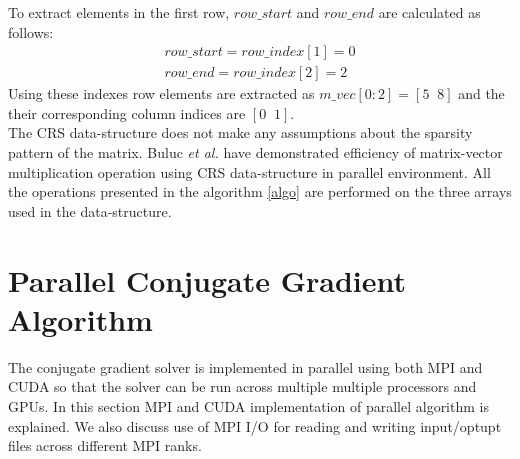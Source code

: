 \documentclass[sigplan,screen]{acmart}
\begin{document}
To extract elements in the first row, $row\_start$ and $row\_end$ are calculated as follows:
\begin{align*}
row\_start = row\_index[1] = 0\\
row\_end = row\_index[2] = 2
\end{align*}
Using these indexes row elements are extracted as $m\_vec[0:2]=[5 \;\; 8]$ and the their corresponding column indices are $[0 \;\; 1]$. \\
The CRS data-structure does not make any assumptions about the sparsity pattern of the matrix. Buluc \textit{et al.} \cite{sparse2} have demonstrated efficiency of matrix-vector multiplication operation using CRS data-structure in parallel environment. All the operations presented in the algorithm \ref{algo} are performed on the three arrays used in the data-structure. 

\section{Parallel Conjugate Gradient Algorithm}
The conjugate gradient solver is implemented in parallel using both MPI and CUDA so that the solver can be run across multiple multiple processors and GPUs. In this section MPI and CUDA implementation of parallel algorithm is explained. We also discuss use of MPI I/O for reading and writing input/optupt files across different MPI ranks.
\end{document}

